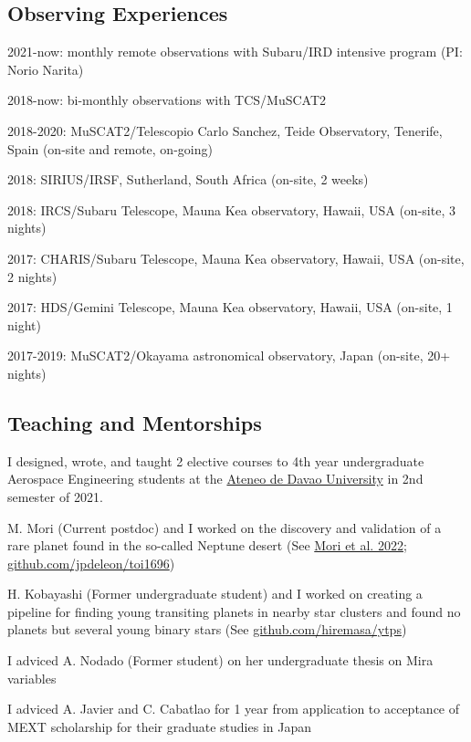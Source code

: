 \documentclass[12pt,letterpaper]{article}
\begin{document}
\subsection{Observing Experiences}
\begin{list}{}{\cvlist}
    \item 2021-now: monthly remote observations with Subaru/IRD intensive program (PI: Norio Narita) 
    \item 2018-now: bi-monthly observations with TCS/MuSCAT2
    \item 2018-2020: MuSCAT2/Telescopio Carlo Sanchez, Teide Observatory, Tenerife, Spain (on-site and remote, on-going)
    \item 2018: SIRIUS/IRSF, Sutherland, South Africa (on-site, 2 weeks)
    \item 2018: IRCS/Subaru Telescope, Mauna Kea observatory, Hawaii, USA (on-site, 3 nights)
    \item 2017: CHARIS/Subaru Telescope, Mauna Kea observatory, Hawaii, USA (on-site, 2 nights)
    \item 2017: HDS/Gemini Telescope, Mauna Kea observatory, Hawaii, USA (on-site, 1 night)
    \item 2017-2019: MuSCAT2/Okayama astronomical observatory, Japan (on-site, 20+ nights)
\end{list}

\subsection{Teaching and Mentorships}
\begin{list}{}{\cvlist}
    \item I designed, wrote, and taught 2 elective courses to 4th year undergraduate Aerospace Engineering students at the \href{http://sea.addu.edu.ph/programs/aerospace-engineering/}{Ateneo de Davao University} in 2nd semester of 2021. \\
    \item M. Mori (Current postdoc) and I worked on the discovery and validation of a rare planet found in the so-called Neptune desert (See \href{https://ui.adsabs.harvard.edu/abs/2022AJ....163..298M/abstract}{Mori et al. 2022}; \href{https://github.com/jpdeleon/toi1696}{github.com/jpdeleon/toi1696})
    \item H. Kobayashi (Former undergraduate student) and I worked on creating a pipeline for finding young transiting planets in nearby star clusters and found no planets but several young binary stars (See \href{https://github.com/hiremasa/ytps}{github.com/hiremasa/ytps})
    \item I adviced A. Nodado (Former student) on her undergraduate thesis on Mira variables
    \item I adviced A. Javier and C. Cabatlao for 1 year from application to acceptance of MEXT scholarship for their graduate studies in Japan
\end{list}
\end{document}
